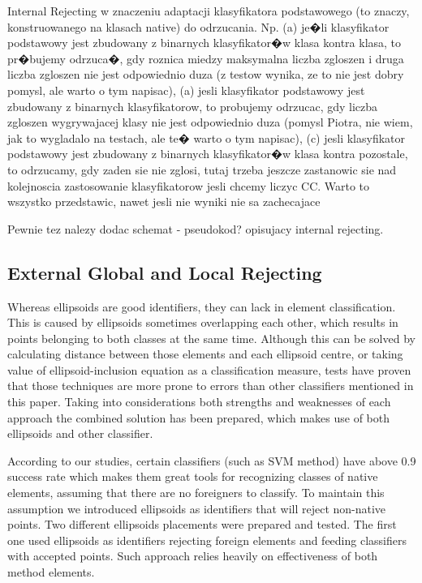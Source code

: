 \documentclass{llncs}
\begin{document}
{\color{yellow}Internal Rejecting w znaczeniu adaptacji klasyfikatora podstawowego (to znaczy, konstruowanego na klasach native) do odrzucania. Np. (a) je�li klasyfikator podstawowy jest zbudowany z binarnych klasyfikator�w klasa kontra klasa, to pr�bujemy odrzuca�, gdy roznica miedzy maksymalna liczba zgloszen i druga liczba zgloszen nie jest odpowiednio duza (z testow wynika, ze to nie jest dobry pomysl, ale warto o tym napisac),}
{\color{red}  (a) jesli klasyfikator podstawowy jest zbudowany z binarnych klasyfikatorow, to probujemy odrzucac, gdy liczba zgloszen wygrywajacej klasy nie jest odpowiednio duza (pomysl Piotra, nie wiem, jak to wygladalo na testach, ale te� warto o tym napisac),}
{\color{yellow} (c) jesli klasyfikator podstawowy jest zbudowany z binarnych klasyfikator�w klasa kontra pozostale, to odrzucamy, gdy zaden sie nie zglosi, tutaj trzeba jeszcze zastanowic sie nad kolejnoscia zastosowanie klasyfikatorow jesli chcemy liczyc CC. Warto to wszystko przedstawic, nawet jesli nie wyniki nie sa zachecajace}

{\color{blue} Pewnie tez nalezy dodac schemat - pseudokod? opisujacy internal rejecting.}

\subsection{External Global and Local Rejecting}
  \label{subsec:GlobalLocalRejecting}

Whereas ellipsoids are good identifiers, they can lack in element classification. This is caused by ellipsoids sometimes overlapping each other, which results in points belonging to both classes at the same time. Although this can be solved by calculating distance between those elements and each ellipsoid centre, or taking value of ellipsoid-inclusion equation as a classification measure, tests have proven that those techniques are more prone to errors than other classifiers mentioned in this paper. Taking into considerations both strengths and weaknesses of each approach the combined solution has been prepared, which makes use of both ellipsoids and other classifier.

According to our studies, certain classifiers (such as SVM method) have above 0.9 success rate which makes them great tools for recognizing classes of native elements, assuming that there are no foreigners to classify. To maintain this assumption we introduced ellipsoids as identifiers that will reject non-native points. Two different ellipsoids placements were prepared and tested. The first one used ellipsoids as identifiers rejecting foreign elements and feeding classifiers with accepted points. Such approach relies heavily on effectiveness of both method elements. 
\end{document}
